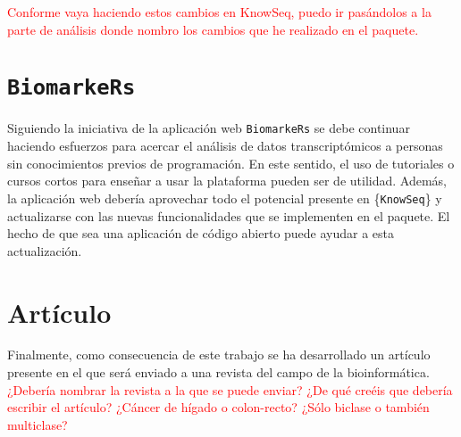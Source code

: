 \textcolor{red}{Conforme vaya haciendo estos cambios en KnowSeq, puedo ir pasándolos a la parte de análisis donde nombro los cambios que he realizado en el paquete.}\\

\section{\texttt{BiomarkeRs}}

Siguiendo la iniciativa de la aplicación web \texttt{BiomarkeRs} se debe continuar haciendo esfuerzos para acercar el análisis de datos transcriptómicos a personas sin conocimientos previos de programación. En este sentido, el uso de tutoriales o cursos cortos para enseñar a usar la plataforma pueden ser de utilidad. Además, la aplicación web debería aprovechar todo el potencial presente en \{\texttt{KnowSeq}\} y actualizarse con las nuevas funcionalidades que se implementen en el paquete. El hecho de que sea una aplicación de código abierto puede ayudar a esta actualización. \\

\section{Artículo}

Finalmente, como consecuencia de este trabajo se ha desarrollado un artículo presente en el  que será enviado a una revista del campo de la bioinformática. \textcolor{red}{¿Debería nombrar la revista a la que se puede enviar? ¿De qué creéis que debería escribir el artículo? ¿Cáncer de hígado o colon-recto? ¿Sólo biclase o también multiclase?}




